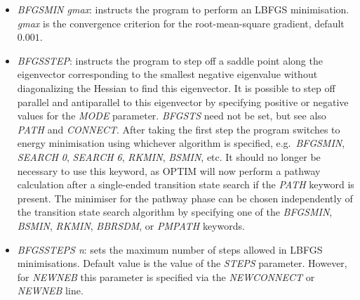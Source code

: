 \documentclass[12pt,a4paper,dvips]{article}
\begin{document}
\begin{itemize}
\item {\it BFGSMIN\/ gmax}: instructs the program to perform an LBFGS minimisation. 
{\it gmax\/} is the convergence criterion
for the root-mean-square gradient, default $0.001$. 

\item {\it BFGSSTEP\/}: instructs the program to step off a saddle point along the
eigenvector corresponding to the smallest negative eigenvalue without
diagonalizing the Hessian to find this eigenvector. It is possible to step off
parallel and antiparallel to this eigenvector by specifying positive or negative values
for the {\it MODE\/} parameter. {\it BFGSTS\/} need not be set, but see also
{\it PATH\/} and {\it CONNECT\/}. After taking the first step the program switches to
energy minimisation using whichever algorithm is specified, e.g.~{\it BFGSMIN\/},
{\it SEARCH 0}, {\it SEARCH 6}, {\it RKMIN\/}, {\it BSMIN\/}, etc.
It should no longer be necessary to use this keyword, as OPTIM will now perform
a pathway calculation after a single-ended transition state search if the {\it PATH\/}
keyword is present. The minimiser for the pathway phase can be chosen independently
of the transition state search algorithm by specifying one of the {\it BFGSMIN\/},
{\it BSMIN\/}, {\it RKMIN\/}, {\it BBRSDM\/}, or {\it PMPATH} keywords.

\item {\it BFGSSTEPS n\/}: sets the maximum number of steps allowed in LBFGS minimisations.
Default value is the value of the {\it STEPS\/} parameter.
However, for {\it NEWNEB\/} this parameter is specified via the {\it NEWCONNECT} or
{\it NEWNEB\/} line.


\end{itemize}
\end{document}
